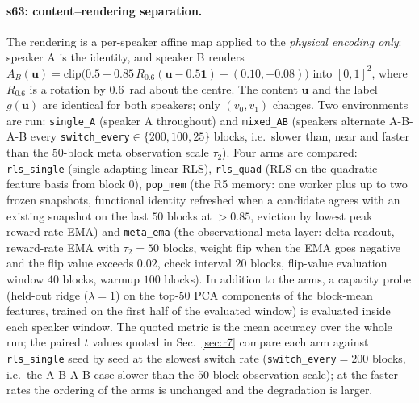 \documentclass[preprint,12pt]{elsarticle}
\begin{document}
\paragraph{s63: content--rendering separation.} The rendering is a
per-speaker affine map applied to the \emph{physical encoding only}: speaker
A is the identity, and speaker B renders
$A_B(\mathbf u)=\mathrm{clip}\big(0.5+0.85\,R_{0.6}(\mathbf u-0.5\mathbf 1)
+(0.10,-0.08)\big)$ into $[0,1]^2$, where $R_{0.6}$ is a rotation by
$0.6$~rad about the centre. The content $\mathbf u$ and the label
$g(\mathbf u)$ are identical for both speakers; only $(v_0,v_1)$ changes.
Two environments are run: \texttt{single\_A} (speaker A throughout) and
\texttt{mixed\_AB} (speakers alternate A-B-A-B every
\texttt{switch\_every}$\in\{200,100,25\}$ blocks, i.e.\ slower than, near and
faster than the $50$-block meta observation scale $\tau_2$). Four arms are
compared: \texttt{rls\_single} (single adapting linear RLS),
\texttt{rls\_quad} (RLS on the quadratic feature basis from block $0$),
\texttt{pop\_mem} (the R5 memory: one worker plus up to two frozen
snapshots, functional identity refreshed when a candidate agrees with an
existing snapshot on the last $50$ blocks at $>0.85$, eviction by lowest peak
reward-rate EMA) and \texttt{meta\_ema} (the observational meta layer: delta
readout, reward-rate EMA with $\tau_2=50$ blocks, weight flip when the EMA
goes negative and the flip value exceeds $0.02$, check interval
$20$ blocks, flip-value evaluation window $40$ blocks, warmup $100$ blocks).
In addition to the arms, a capacity probe (held-out ridge ($\lambda=1$)
on the top-$50$ PCA components of the block-mean features, trained on the
first half of the evaluated window) is evaluated inside each speaker
window. The quoted metric is the mean accuracy over the whole run; the
paired $t$ values quoted in Sec.~\ref{sec:r7} compare each arm against
\texttt{rls\_single} seed by seed at the slowest switch rate
(\texttt{switch\_every}$=200$ blocks, i.e.\ the A-B-A-B case slower than the
$50$-block observation scale); at the faster rates the ordering of the arms
is unchanged and the degradation is larger.
\end{document}

